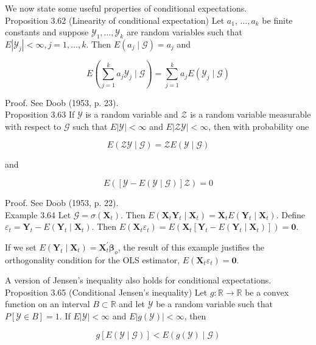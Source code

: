 \documentclass[10pt]{article}
\begin{document}
We now state some useful properties of conditional expectations.\\
Proposition 3.62 (Linearity of conditional expectation) Let $a_{1}$, $\ldots, a_{k}$ be finite constants and suppose $\mathcal{Y}_{1}, \ldots, \mathcal{Y}_{k}$ are random variables such that $E\left|\mathcal{Y}_{j}\right|<\infty, j=1, \ldots, k$. Then $E\left(a_{j} \mid \mathcal{G}\right)=a_{j}$ and

$$
E\left(\sum_{j=1}^{k} a_{j} \mathcal{Y}_{j} \mid \mathcal{G}\right)=\sum_{j=1}^{k} a_{j} E\left(\mathcal{Y}_{j} \mid \mathcal{G}\right)
$$

Proof. See Doob (1953, p. 23).\\
Proposition 3.63 If $\mathcal{Y}$ is a random variable and $\mathcal{Z}$ is a random variable measurable with respect to $\mathcal{G}$ such that $E|\mathcal{Y}|<\infty$ and $E|\mathcal{Z} \mathcal{Y}|<\infty$, then with probability one

$$
E(\mathcal{Z} \mathcal{Y} \mid \mathcal{G})=\mathcal{Z} E(\mathcal{Y} \mid \mathcal{G})
$$

and

$$
E([\mathcal{Y}-E(\mathcal{Y} \mid \mathcal{G})] \mathcal{Z})=0
$$

Proof. See Doob (1953, p. 22).\\
Example 3.64 Let $\mathcal{G}=\sigma\left(\mathbf{X}_{t}\right)$. Then $E\left(\mathbf{X}_{t} \mathbf{Y}_{t} \mid \mathbf{X}_{t}\right)=\mathbf{X}_{t} E\left(\mathbf{Y}_{t} \mid \mathbf{X}_{t}\right)$. Define $\varepsilon_{t}=\mathbf{Y}_{t}-E\left(\mathbf{Y}_{t} \mid \mathbf{X}_{t}\right)$. Then $E\left(\mathbf{X}_{t} \varepsilon_{t}\right)=E\left(\mathbf{X}_{t}\left[\mathbf{Y}_{t}-E\left(\mathbf{Y}_{t} \mid \mathbf{X}_{t}\right)\right]\right)=\mathbf{0}$.

If we set $E\left(\mathbf{Y}_{t} \mid \mathbf{X}_{t}\right)=\mathbf{X}_{t}^{\prime} \boldsymbol{\beta}_{o}$, the result of this example justifies the orthogonality condition for the OLS estimator, $E\left(\mathbf{X}_{t} \varepsilon_{t}\right)=\mathbf{0}$.

A version of Jensen's inequality also holds for conditional expectations.\\
Proposition 3.65 (Conditional Jensen's inequality) Let $g: \mathbb{R} \rightarrow \mathbb{R}$ be a convex function on an interval $B \subset \mathbb{R}$ and let $\mathcal{Y}$ be a random variable such that $P[\mathcal{Y} \in B]=1$. If $E|\mathcal{Y}|<\infty$ and $E|g(\mathcal{Y})|<\infty$, then

$$
g[E(\mathcal{Y} \mid \mathcal{G})]<E(g(\mathcal{Y}) \mid \mathcal{G})
$$
\end{document}
